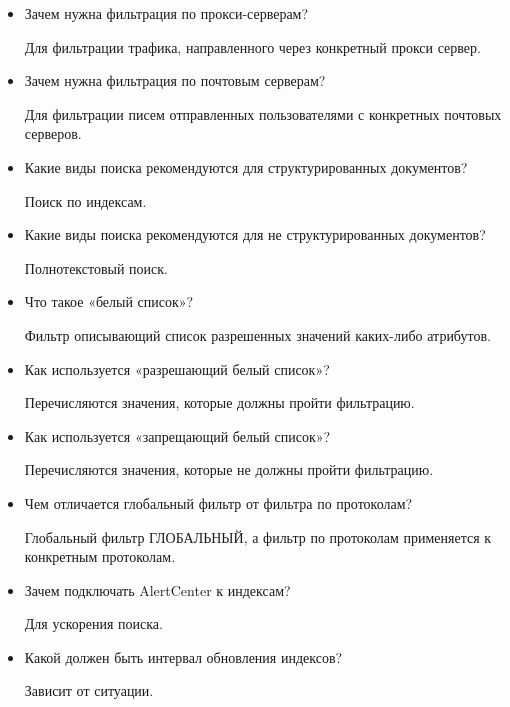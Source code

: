 \begin{itemize}
  \item Зачем нужна фильтрация по прокси-серверам?

    Для фильтрации трафика, направленного через конкретный прокси сервер.

  \item Зачем нужна фильтрация по почтовым серверам?

    Для фильтрации писем отправленных пользователями с конкретных почтовых
    серверов.

  \item Какие виды поиска рекомендуются для структурированных документов?

    Поиск по индексам.

  \item Какие виды поиска рекомендуются для не структурированных документов?

    Полнотекстовый поиск.

  \item Что такое «белый список»?

    Фильтр описывающий список разрешенных значений каких-либо атрибутов.

  \item Как используется «разрешающий белый список»?

    Перечисляются значения, которые должны пройти фильтрацию.

  \item Как используется «запрещающий белый список»? 

    Перечисляются значения, которые не должны пройти фильтрацию.

  \item Чем отличается глобальный фильтр от фильтра по протоколам?

    Глобальный фильтр ГЛОБАЛЬНЫЙ, а фильтр по протоколам применяется к
    конкретным протоколам.

  \item Зачем подключать AlertCenter к индексам?

    Для ускорения поиска.

  \item Какой должен быть интервал обновления индексов? 

    Зависит от ситуации.
\end{itemize}
